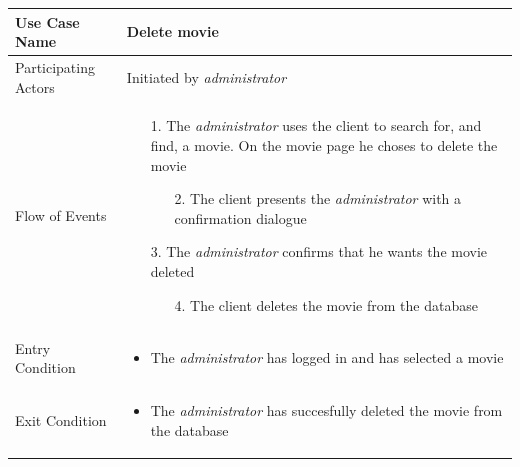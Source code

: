\begin{center}
	\begin{tabular}{ | l | p{10cm} |  }
		 \hline
		Use Case Name & Delete movie \\ \hline
		Participating Actors & Initiated by \emph{administrator} \\ \hline
		Flow of Events & \begin{enumerate}
						\item[1.] The \emph{administrator} uses the client to search for, and find, a movie. On the movie page he choses to delete the movie
						\begin{enumerate}
							\item[2.] The client presents the \emph{administrator} with a confirmation dialogue
						\end{enumerate}
						\item[3.] The \emph{administrator} confirms that he wants the movie deleted
						\begin{enumerate}
							\item[4.] The client deletes the movie from the database
						\end{enumerate}
					\end{enumerate} \\ \hline
		Entry Condition & \begin{itemize}
						\item The \emph{administrator} has logged in and has selected a movie
					\end{itemize} \\ \hline
		Exit Condition & \begin{itemize}
						\item The \emph{administrator} has succesfully deleted the movie from the database
					\end{itemize} \\
		\hline
	\end{tabular}
\end{center}


